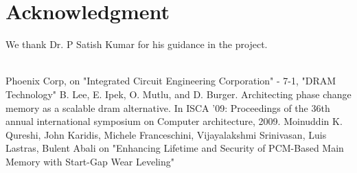 \documentclass[11pt, conference, onecolumn]{IEEEtran}
\begin{document}
\section*{Acknowledgment}
We thank Dr. P Satish Kumar for his guidance in the project.
\\
\\
\begin{thebibliography}{00}



 Phoenix Corp, on "Integrated Circuit Engineering Corporation" - 7-1, "DRAM Technology"
B. Lee, E. Ipek, O. Mutlu, and D. Burger. Architecting phase
change memory as a scalable dram alternative. In ISCA ’09:
Proceedings of the 36th annual international symposium on
Computer architecture, 2009.
 Moinuddin K. Qureshi, John Karidis, Michele Franceschini, Vijayalakshmi Srinivasan, Luis Lastras, Bulent Abali on "Enhancing Lifetime and Security of PCM-Based
Main Memory with Start-Gap Wear Leveling"
\end{thebibliography}
\vspace{12pt}

\end{document}
